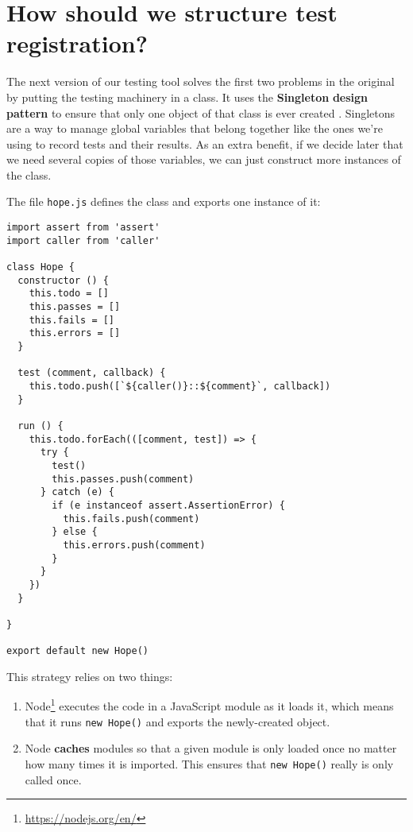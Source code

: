 \documentclass[krantzl]{krantz}
\newcommand{\glossref}[1]{\textbf{#1}}
\newcommand{\hreffoot}[2]{{#1}\footnote{\href{#2}{#2}}}
\begin{document}
\section{How should we structure test registration?}\label{unit-test-registration}


The next version of our testing tool solves the first two problems in the original
by putting the testing machinery in a class.
It uses the \glossref{Singleton} \glossref{design pattern}
to ensure that only one object of that class is ever created \cite{Osmani2017}.
Singletons are a way to manage global variables that belong together
like the ones we’re using to record tests and their results.
As an extra benefit,
if we decide later that we need several copies of those variables,
we can just construct more instances of the class.


The file \texttt{hope.js} defines the class and exports one instance of it:


\begin{lstlisting}[frame=tblr]
import assert from 'assert'
import caller from 'caller'

class Hope {
  constructor () {
    this.todo = []
    this.passes = []
    this.fails = []
    this.errors = []
  }

  test (comment, callback) {
    this.todo.push([`${caller()}::${comment}`, callback])
  }

  run () {
    this.todo.forEach(([comment, test]) => {
      try {
        test()
        this.passes.push(comment)
      } catch (e) {
        if (e instanceof assert.AssertionError) {
          this.fails.push(comment)
        } else {
          this.errors.push(comment)
        }
      }
    })
  }

}

export default new Hope()
\end{lstlisting}



This strategy relies on two things:

\begin{enumerate}

\item 

\hreffoot{Node}{https://nodejs.org/en/} executes the code in a JavaScript module as it loads it,
    which means that it runs \texttt{new Hope()} and exports the newly-created object.



\item 

Node \glossref{caches} modules
    so that a given module is only loaded once
    no matter how many times it is imported.
    This ensures that \texttt{new Hope()} really is only called once.



\end{enumerate}
\end{document}
